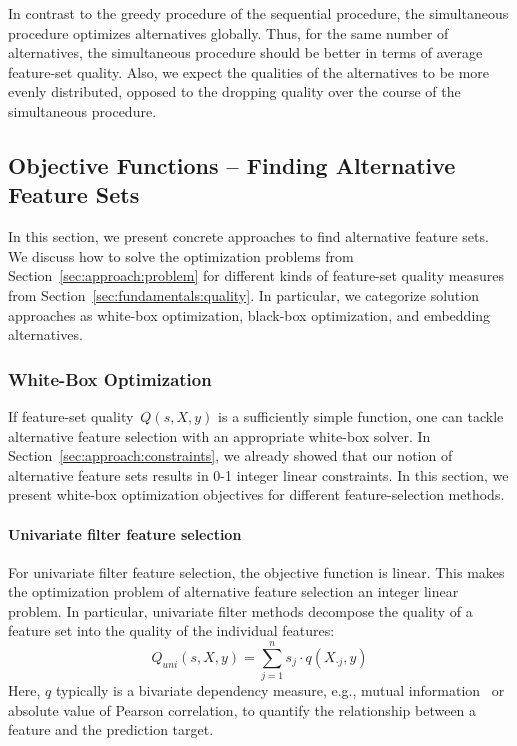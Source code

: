\documentclass{article}
\theoremstyle{definition}
\begin{document}
In contrast to the greedy procedure of the sequential procedure, the simultaneous procedure optimizes alternatives globally.
Thus, for the same number of alternatives, the simultaneous procedure should be better in terms of average feature-set quality.
Also, we expect the qualities of the alternatives to be more evenly distributed, opposed to the dropping quality over the course of the simultaneous procedure.

\subsection{Objective Functions -- Finding Alternative Feature Sets}
\label{sec:approach:objectives}

In this section, we present concrete approaches to find alternative feature sets.
We discuss how to solve the optimization problems from Section~\ref{sec:approach:problem} for different kinds of feature-set quality measures from Section~\ref{sec:fundamentals:quality}.
In particular, we categorize solution approaches as white-box optimization, black-box optimization, and embedding alternatives.

\subsubsection{White-Box Optimization}
\label{sec:approach:objectives:white-box}

If feature-set quality~$Q(s,X,y)$ is a sufficiently simple function, one can tackle alternative feature selection with an appropriate white-box solver.
In Section~\ref{sec:approach:constraints}, we already showed that our notion of alternative feature sets results in 0-1 integer linear constraints.
In this section, we present white-box optimization objectives for different feature-selection methods.

\paragraph{Univariate filter feature selection}

For univariate filter feature selection, the objective function is linear.
This makes the optimization problem of alternative feature selection an integer linear problem.
In particular, univariate filter methods decompose the quality of a feature set into the quality of the individual features:
%
\begin{equation}
	Q_{uni}(s,X,y) = \sum_{j=1}^{n} s_j  \cdot q(X_{\cdot{}j},y)
	\label{eq:univariate-filter}
\end{equation}
%
Here, $q$ typically is a bivariate dependency measure, e.g., mutual information~\cite{kraskov2004estimating} or absolute value of Pearson correlation, to quantify the relationship between a feature and the prediction target.
\end{document}
